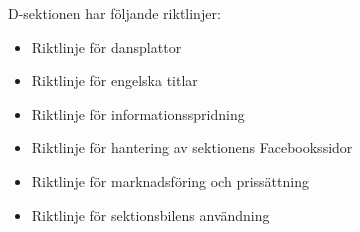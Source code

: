 \documentclass[]{dsekprotokoll}
\begin{document}
D-sektionen har följande riktlinjer:
\begin{itemize}
    \item Riktlinje för dansplattor
    \item Riktlinje för engelska titlar
    \item Riktlinje för informationsspridning
    \item Riktlinje för hantering av sektionens Facebookssidor
    \item Riktlinje för marknadsföring och prissättning
    \item Riktlinje för sektionsbilens användning
\end{itemize}
\end{document}
